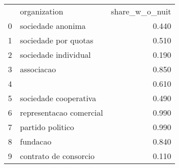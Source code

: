 \begin{tabular}{llr}
 & organization & share_w_o_nuit \\
0 & sociedade anonima & 0.440 \\
1 & sociedade por quotas & 0.510 \\
2 & sociedade individual & 0.190 \\
3 & associacao & 0.850 \\
4 &  & 0.610 \\
5 & sociedade cooperativa & 0.490 \\
6 & representacao comercial & 0.990 \\
7 & partido politico & 0.990 \\
8 & fundacao & 0.840 \\
9 & contrato de consorcio & 0.110 \\
\end{tabular}
